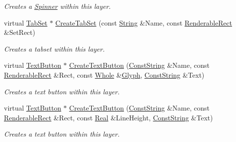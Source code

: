 \begin{DoxyCompactItemize}
\begin{DoxyCompactList}\small\item\em Creates a \hyperlink{classMezzanine_1_1UI_1_1Spinner}{Spinner} within this layer. \item\end{DoxyCompactList}\item 
virtual \hyperlink{classMezzanine_1_1UI_1_1TabSet}{TabSet} $\ast$ \hyperlink{classMezzanine_1_1UI_1_1Layer_a1b153a3fa9ba59910ffa38118df07095}{CreateTabSet} (const \hyperlink{namespaceMezzanine_acf9fcc130e6ebf08e3d8491aebcf1c86}{String} \&Name, const \hyperlink{structMezzanine_1_1UI_1_1RenderableRect}{RenderableRect} \&SetRect)
\begin{DoxyCompactList}\small\item\em Creates a tabset within this layer. \item\end{DoxyCompactList}\item 
virtual \hyperlink{classMezzanine_1_1UI_1_1TextButton}{TextButton} $\ast$ \hyperlink{classMezzanine_1_1UI_1_1Layer_a47b0d4849e7a74c2f886d5618a8216e8}{CreateTextButton} (\hyperlink{namespaceMezzanine_a63cd699ac54b73953f35ec9cfc05e506}{ConstString} \&Name, const \hyperlink{structMezzanine_1_1UI_1_1RenderableRect}{RenderableRect} \&Rect, const \hyperlink{namespaceMezzanine_adcbb6ce6d1eb4379d109e51171e2e493}{Whole} \&\hyperlink{classMezzanine_1_1UI_1_1Glyph}{Glyph}, \hyperlink{namespaceMezzanine_a63cd699ac54b73953f35ec9cfc05e506}{ConstString} \&Text)
\begin{DoxyCompactList}\small\item\em Creates a text button within this layer. \item\end{DoxyCompactList}\item 
virtual \hyperlink{classMezzanine_1_1UI_1_1TextButton}{TextButton} $\ast$ \hyperlink{classMezzanine_1_1UI_1_1Layer_a798fc69951c6d853fbebacd113221ec1}{CreateTextButton} (\hyperlink{namespaceMezzanine_a63cd699ac54b73953f35ec9cfc05e506}{ConstString} \&Name, const \hyperlink{structMezzanine_1_1UI_1_1RenderableRect}{RenderableRect} \&Rect, const \hyperlink{namespaceMezzanine_a726731b1a7df72bf3583e4a97282c6f6}{Real} \&LineHeight, \hyperlink{namespaceMezzanine_a63cd699ac54b73953f35ec9cfc05e506}{ConstString} \&Text)
\begin{DoxyCompactList}\small\item\em Creates a text button within this layer. \item\end{DoxyCompactList}\item 

\end{DoxyCompactItemize}
